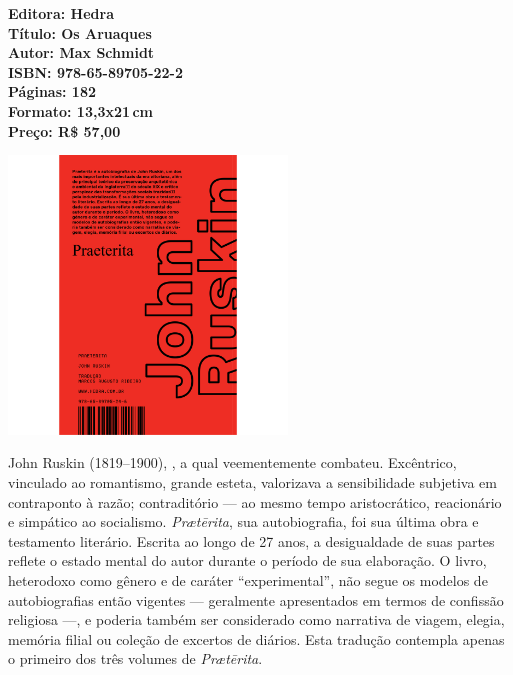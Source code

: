 \vfill
\noindent\begin{minipage}[c]{1\linewidth}
{\small\textbf{
\hspace*{-.1cm}Editora: Hedra\\
Título: Os Aruaques\\
Autor: Max Schmidt\\ 
ISBN: 978-65-89705-22-2\\
Páginas: 182\\
Formato: 13,3x21\,cm\\
Preço: R\$ 57,00\\
}}
\end{minipage}
\pagebreak

\begin{center}
\hspace*{.5cm}\includegraphics[width=74mm]{./CAPAS/HEDRA_RUSKIN.jpg}
\end{center}
\hspace*{-7cm}\hrulefill\hspace*{-7cm}
\medskip

\noindent{}John Ruskin (1819--1900), , a qual veementemente combateu. Excêntrico, vinculado ao romantismo, grande esteta, valorizava a sensibilidade subjetiva em contraponto à razão; contraditório --- ao mesmo tempo aristocrático, reacionário e simpático ao socialismo. \textit{Prætērita}, sua autobiografia, foi sua última obra e testamento literário. Escrita ao longo de 27 anos, a desigualdade de suas partes reflete o estado mental do autor durante o período de sua elaboração. O livro, heterodoxo como gênero e de caráter ``experimental'', não segue os modelos de autobiografias então vigentes --- geralmente apresentados em termos de confissão religiosa ---, e poderia também ser considerado como narrativa de viagem, elegia, memória filial ou coleção de excertos de diários. Esta tradução contempla apenas o primeiro dos três volumes de \textit{Prætērita}.

